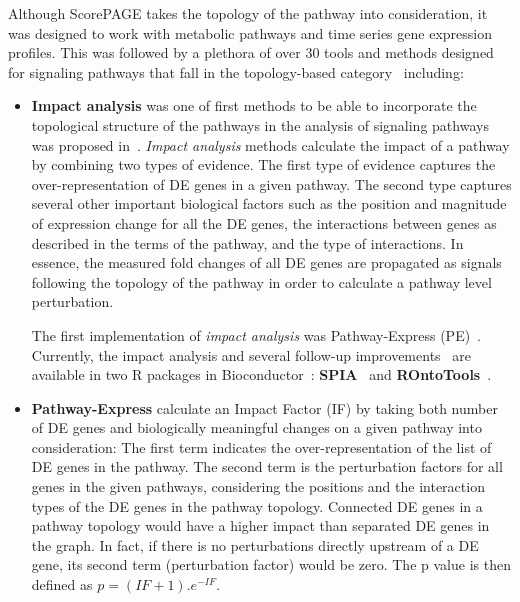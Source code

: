 Although ScorePAGE takes the topology of the pathway into consideration, it was designed to work with metabolic pathways and time series gene expression profiles.
This was followed by a plethora of over 30 tools and methods designed for signaling pathways that fall in the topology-based category~\cite{mitrea2013methods} including: 

\begin{itemize}
\item \textbf{Impact analysis} was one of first methods to be able to incorporate the topological structure of the pathways in the analysis of signaling pathways was proposed in~\cite{draghici2007systems}. %
\textit{Impact analysis} methods calculate the impact of a pathway by combining two types of evidence.
The first type of evidence captures the over-representation of DE genes in a given pathway.  The second type captures several other important biological factors such as the position and magnitude of expression change for all the DE genes, the interactions between genes as described in the terms of the pathway, and the type of interactions. In essence, the measured fold changes of all DE genes are propagated as signals following the topology of the pathway in order to calculate a pathway level perturbation. 

The first implementation of \textit{impact analysis} was  Pathway-Express (PE)~\cite{draghici2007systems}.
Currently, the impact analysis and several follow-up improvements~\cite{voichita2012incorporating, ansari2017approach} are available in two R packages in Bioconductor~\cite{Yang:2002c}: \textbf{SPIA}~\cite{SPIAversion2.14.0} and \textbf{ROntoTools}~\cite{RontoToolsVersion1.2.0}.

\item \textbf{Pathway-Express} \cite{draghici2007systems, khatri:2007a} calculate an Impact Factor (IF) by taking both number of DE genes and biologically meaningful changes on a given pathway into consideration: The first term indicates the over-representation of the list of DE genes in the pathway. The second term is the perturbation factors for all genes in the given pathways, considering the positions and the interaction types of the DE genes in the pathway topology. Connected DE genes in a pathway topology would have a higher impact than separated DE genes in the graph. In fact, if there is no perturbations directly upstream of a DE gene, its second term (perturbation factor) would be zero. The p value is then defined as $p = (IF + 1).e^{-IF}$.


\end{itemize}
